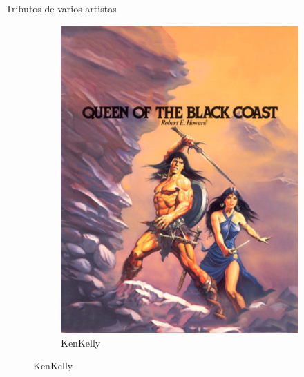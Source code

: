 \begin{frame}{Tributos de varios artistas}
\begin{figure}[htp]
\begin{subfigure}[b]{0.22\textwidth}
			\includegraphics[width=\textwidth]{img/tributos/KenKelly}
			\caption{KenKelly}
		\end{subfigure}
	\end{figure}
\end{frame}
\note[itemize]{
	\item
}

